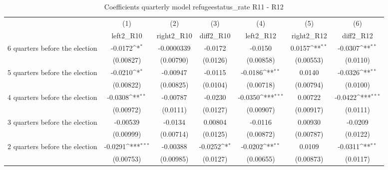 \begin{table}[htbp]\centering
\def\sym#1{\ifmmode^{#1}\else\(^{#1}\)\fi}
\caption{Coefficients quarterly model refugeestatus\_rate R11 - R12}
\begin{tabular}{l*{6}{c}}
\hline\hline
                    &\multicolumn{1}{c}{(1)}&\multicolumn{1}{c}{(2)}&\multicolumn{1}{c}{(3)}&\multicolumn{1}{c}{(4)}&\multicolumn{1}{c}{(5)}&\multicolumn{1}{c}{(6)}\\
                    &\multicolumn{1}{c}{left2\_R10}&\multicolumn{1}{c}{right2\_R10}&\multicolumn{1}{c}{diff2\_R10}&\multicolumn{1}{c}{left2\_R12}&\multicolumn{1}{c}{right2\_R12}&\multicolumn{1}{c}{diff2\_R12}\\
\hline
 6 quarters before the election&     -0.0172\sym{*}  &  -0.0000339         &     -0.0172         &     -0.0150         &      0.0157\sym{**} &     -0.0307\sym{**} \\
                    &   (0.00827)         &   (0.00790)         &    (0.0126)         &   (0.00858)         &   (0.00553)         &    (0.0110)         \\
[1em]
 5 quarters before the election&     -0.0210\sym{*}  &    -0.00947         &     -0.0115         &     -0.0186\sym{**} &      0.0140         &     -0.0326\sym{**} \\
                    &   (0.00822)         &   (0.00825)         &    (0.0104)         &   (0.00718)         &   (0.00794)         &    (0.0100)         \\
[1em]
 4 quarters before the election&     -0.0308\sym{**} &    -0.00787         &     -0.0230         &     -0.0350\sym{***}&     0.00722         &     -0.0422\sym{***}\\
                    &   (0.00972)         &    (0.0111)         &    (0.0127)         &   (0.00907)         &   (0.00917)         &    (0.0111)         \\
[1em]
 3 quarters before the election&    -0.00539         &     -0.0134         &     0.00804         &     -0.0116         &     0.00930         &     -0.0209         \\
                    &   (0.00999)         &   (0.00714)         &    (0.0125)         &   (0.00872)         &   (0.00787)         &    (0.0122)         \\
[1em]
 2 quarters before the election&     -0.0291\sym{***}&    -0.00388         &     -0.0252\sym{*}  &     -0.0202\sym{**} &      0.0109         &     -0.0311\sym{**} \\
                    &   (0.00753)         &   (0.00985)         &    (0.0127)         &   (0.00655)         &   (0.00873)         &    (0.0117)         \\

\end{tabular}
\end{table}

